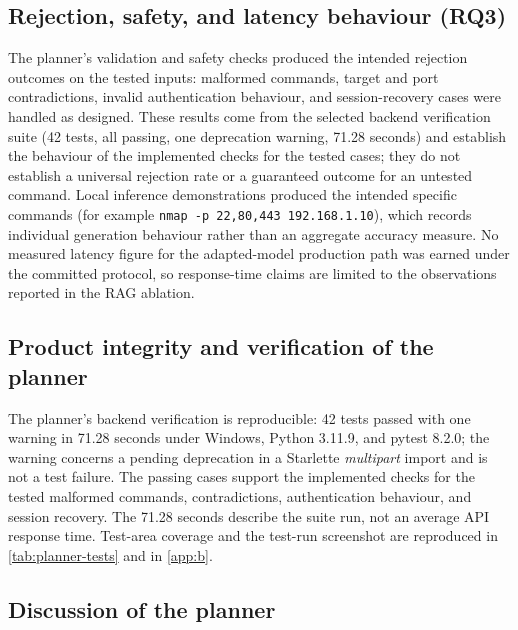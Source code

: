 \subsection{Rejection, safety, and latency behaviour (RQ3)}\label{sec:results-planner-safety}

The planner's validation and safety checks produced the intended rejection
outcomes on the tested inputs: malformed commands, target and port
contradictions, invalid authentication behaviour, and session-recovery cases
were handled as designed. These results come from the selected backend
verification suite (42 tests, all passing, one deprecation warning, 71.28
seconds) and establish the behaviour of the implemented checks for the tested
cases; they do not establish a universal rejection rate or a guaranteed outcome
for an untested command. Local inference demonstrations produced the intended
specific commands (for example \texttt{nmap -p 22,80,443 192.168.1.10}), which
records individual generation behaviour rather than an aggregate accuracy
measure. No measured latency figure for the adapted-model production path was
earned under the committed protocol, so response-time claims are limited to the
observations reported in the RAG ablation.

\subsection{Product integrity and verification of the planner}\label{sec:results-planner-testing}

The planner's backend verification is reproducible: 42 tests passed with one
warning in 71.28 seconds under Windows, Python 3.11.9, and pytest 8.2.0; the
warning concerns a pending deprecation in a Starlette \emph{multipart} import
and is not a test failure. The passing cases support the implemented checks for
the tested malformed commands, contradictions, authentication behaviour, and
session recovery. The 71.28 seconds describe the suite run, not an average API
response time. Test-area coverage and the test-run screenshot are reproduced in
\cref{tab:planner-tests} and in \cref{app:b}.

\subsection{Discussion of the planner}\label{sec:results-planner-discussion}

